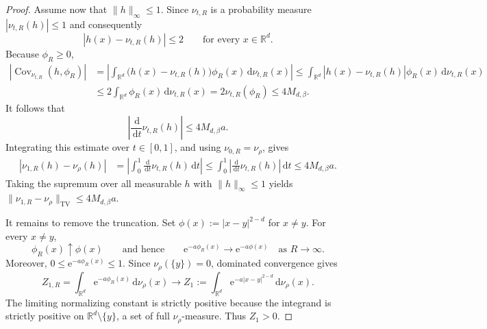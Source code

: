 \documentclass[12pt,reqno,letterpaper]{amsart}
\theoremstyle{definition}
\theoremstyle{remark}
\numberwithin{equation}{section}
\newcommand{\R}{\mathbb R}
\newcommand{\dd}{\,\mathrm d}
\newcommand{\ee}{\mathrm e}
\newcommand{\be}{\beta}
\newcommand{\TV}{\mathrm{TV}}
\begin{document}
\begin{proof}
Assume now that \(\|h\|_\infty\le1\).  Since \(\nu_{t,R}\) is a
probability measure $|\nu_{t,R}(h)|\le1$
and consequently
\[
 |h(x)-\nu_{t,R}(h)|\le2
 \qquad\text{for every }x\in\R^d.
\]
Because \(\phi_R\ge0\),
\begin{align*}
 \left|
 \operatorname{Cov}_{\nu_{t,R}}(h,\phi_R)
 \right|
 &=
 \left|
 \int_{\R^d}
 \bigl(h(x)-\nu_{t,R}(h)\bigr)\phi_R(x)
 \dd\nu_{t,R}(x)
 \right|\le
 \int_{\R^d}
 |h(x)-\nu_{t,R}(h)|\phi_R(x)
 \dd\nu_{t,R}(x)\\
 &\le
 2\int_{\R^d}\phi_R(x)\dd\nu_{t,R}(x)=
 2\nu_{t,R}(\phi_R)\le4M_{d,\be}.
\end{align*}
It follows that
\[
 \left|
 \frac{\dd}{\dd t}\nu_{t,R}(h)
 \right|
 \le4M_{d,\be}a.
\]
Integrating this estimate over \(t\in[0,1]\), and using
\(\nu_{0,R}=\nu_\rho\), gives
\begin{align*}
 |\nu_{1,R}(h)-\nu_\rho(h)|
 &=
 \left|
 \int_0^1
 \frac{\dd}{\dd t}\nu_{t,R}(h)\dd t
 \right|\le
 \int_0^1
 \left|
 \frac{\dd}{\dd t}\nu_{t,R}(h)
 \right|\dd t \le4M_{d,\be}a.
\end{align*}
Taking the supremum over all measurable \(h\) with
\(\|h\|_\infty\le1\) yields $\|\nu_{1,R}-\nu_\rho\|_{\TV}
 \le4M_{d,\be}a.$

It remains to remove the truncation.  Set $\phi(x):=|x-y|^{2-d}$ for $x\ne y.$
For every \(x\ne y\),
\[
 \phi_R(x)\uparrow\phi(x)
 \qquad\text{and hence}\qquad
 \ee^{-a\phi_R(x)}\longrightarrow\ee^{-a\phi(x)}
 \quad\text{as }R\to\infty.
\]
Moreover, $0\le\ee^{-a\phi_R(x)}\le1.$
Since \(\nu_\rho(\{y\})=0\), dominated convergence gives
\[
 Z_{1,R}
 =
 \int_{\R^d}\ee^{-a\phi_R(x)}\dd\nu_\rho(x)
 \longrightarrow
 Z_1
 :=
 \int_{\R^d}\ee^{-a|x-y|^{2-d}}\dd\nu_\rho(x).
\]
The limiting normalizing constant is strictly positive because the
integrand is strictly positive on \(\R^d\setminus\{y\}\), a set of full
\(\nu_\rho\)-measure.  Thus \(Z_1>0\).


\end{proof}
\end{document}
